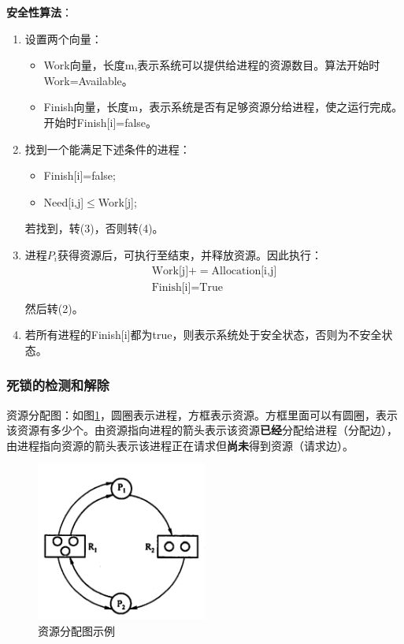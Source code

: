 \documentclass[12pt, a4paper, oneside]{ctexart}
\begin{document}
\textbf{安全性算法}：

\begin{enumerate}
  \item [(1). ] 设置两个向量：
  \begin{itemize}
    \item Work向量，长度m,表示系统可以提供给进程的资源数目。算法开始时Work=Available。
    \item Finish向量，长度m，表示系统是否有足够资源分给进程，使之运行完成。开始时Finish[i]=false。
  \end{itemize}
  \item [(2). ] 找到一个能满足下述条件的进程：
  \begin{itemize}
    \item Finish[i]=false;
    \item Need[i,j]$\leq$Work[j];
  \end{itemize}
  若找到，转(3)，否则转(4)。
  \item [(3). ] 进程$P_i$获得资源后，可执行至结束，并释放资源。因此执行：
  \begin{gather*}
    \text{Work[j]}+=\text{Allocation[i,j]}\\
    \text{Finish[i]}=\text{True}\\
  \end{gather*}
  然后转(2)。
  \item [(4). ] 若所有进程的Finish[i]都为true，则表示系统处于安全状态，否则为不安全状态。
\end{enumerate}

\subsubsection{死锁的检测和解除}

资源分配图：如图\ref{resource_allocation_graph}，圆圈表示进程，方框表示资源。方框里面可以有圆圈，表示该资源有多少个。由资源指向进程的箭头表示该资源\textbf{已经}分配给进程（分配边），由进程指向资源的箭头表示该进程正在请求但\textbf{尚未}得到资源（请求边）。

\begin{figure}
  \centering
  \includegraphics[width=0.5\textwidth]{./images/resource_allocation_graph.png}
  \caption{资源分配图示例}
  \label{resource_allocation_graph}
\end{figure}
\end{document}
